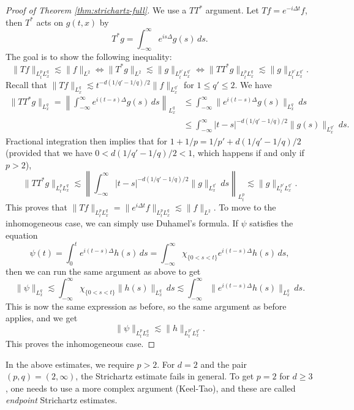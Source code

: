 \begin{proof}[Proof of Theorem \ref{thm:strichartz-full}]
  We use a $TT^*$ argument. Let
  $Tf = e^{-i\Delta t} f$, then $T^*$ acts
  on $g(t, x)$ by
  \[
    T^* g
    = \int_{-\infty}^\infty e^{is\Delta} g(s)\, ds.
  \]
  The goal is to show the following inequality:
  \[
    \|Tf\|_{L^p_t L^q_x}
    \lesssim \|f\|_{L^2}
    \iff \|T^* g\|_{L^2} \lesssim \|g\|_{L^{p'}_t L^{q'}_x}
    \iff \|T T^* g\|_{L^p_t L^q_x}
    \lesssim \|g\|_{L^{p'}_t L^{q'}_x}.
  \]
  Recall that $\|Tf\|_{L^q_x} \lesssim t^{-d(1 / q' - 1 / q) / 2} \|f\|_{L^{q'}_x}$
  for $1 \le q' \le 2$. We have
  \begin{align*}
    \|TT^* g\|_{L^q_x}
    =
    \left\|
    \int_{-\infty}^\infty e^{i(t - s)\Delta} g(s)\, ds
    \right\|_{L^q_x}
    &\le \int_{-\infty}^\infty
    \|e^{i(t - s)\Delta} g(s)\|_{L^q_x}\, ds \\
    &\le \int_{-\infty}^\infty
    |t - s|^{-d (1 / q' - 1 / q) / 2}
    \|g(s)\|_{L^{q'}_x}\, ds.
  \end{align*}
  Fractional integration then implies that
  for $1 + 1 / p = 1 / p' + d(1 / q' - 1 / q) / 2$ (provided that we have
  $0 < d (1 / q' - 1 / q) / 2 < 1$, which happens
  if and only if $p > 2$),
  \[
    \|TT^* g\|_{L^p_t L^q_x}
    \lesssim \left\|\int_{-\infty}^\infty |t - s|^{-d(1 / q' - 1 / q) / 2}
    \|g\|_{L^{q'}_x}\, ds\right\|_{L^p_t}
    \lesssim \|g\|_{L^{p'}_t L^{q'}_x}.
  \]
  This proves that $\|Tf\|_{L^p_t L^q_x} = \|e^{i\Delta t} f\|_{L^p_t L^q_x} \lesssim \|f\|_{L^2}$.
  To move to the inhomogeneous case, we can
  simply use Duhamel's formula. If
  $\psi$ satisfies the equation
  \[
    \psi(t) = \int_0^t e^{i(t - s)\Delta} h(s)\, ds
    = \int_{-\infty}^\infty \chi_{\{0 < s < t\}}
    e^{i(t - s)\Delta} h(s)\, ds,
  \]
  then we can run the same argument as above
  to get
  \[
    \|\psi\|_{L^q_x}
    \lesssim \int_{-\infty}^\infty \chi_{\{0 < s < t\}} \|h(s)\|_{L^{q}_x}\, ds
    \lesssim \int_{-\infty}^\infty \|e^{i(t - s)\Delta} h(s)\|_{L^q_x}\, ds.
  \]
  This is now the same expression as before,
  so the same argument as before applies, and
  we get
  \[
    \|\psi\|_{L^p_t L^q_x} \lesssim \|h\|_{L^{p'}_t L^{q'}_x}.
  \]
  This proves the inhomogeneous case.
\end{proof}

\begin{remark}
  In the above estimates, we require
  $p > 2$. For $d = 2$ and the pair
  $(p, q) = (2, \infty)$,
  the Strichartz estimate fails in general.
  To get $p = 2$ for $d \ge 3$, one needs to
  use a more complex argument (Keel-Tao), and
  these are called \emph{endpoint} Strichartz
  estimates.
\end{remark}

